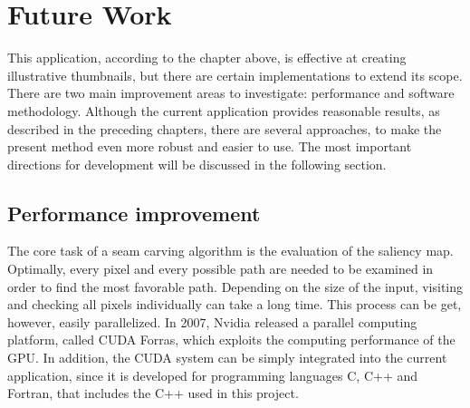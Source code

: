 \documentclass[draft,final]{vutinfth} %
\begin{document}
	\chapter{Future Work}
	\label{futureWork}
	This application, according to the chapter above, is effective at creating illustrative thumbnails, but there are certain implementations to extend its scope. 
	There are two main improvement areas to investigate: performance and software methodology.
	Although the current application provides reasonable results, as described in the preceding chapters, there are several approaches, to make the present method even more robust and easier to use.
	The most important directions for development will be discussed in the following section.
	
	\section{Performance improvement} 
	The core task of a seam carving algorithm is the evaluation of the saliency map.
	Optimally, every pixel and every possible path are needed to be examined in order to find the most favorable path.
	Depending on the size of the input, visiting and checking all pixels individually can take a long time.
	This process can be get, however, easily parallelized.
	In 2007, Nvidia released a parallel computing platform, called CUDA Forras, which exploits the computing performance of the GPU.
	In addition, the CUDA system can be simply integrated into the current application, since it is developed for programming languages C, C++ and Fortran, that includes the C++ used in this project.   
	
\end{document}
